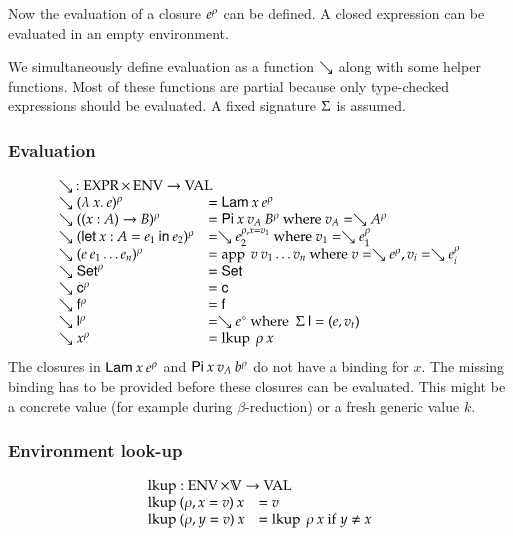 Now the evaluation of a closure $e^{\rho}$ can be defined. 
A closed expression can be evaluated in an empty environment.

We simultaneously define evaluation as a function $\searrow$ along with some helper functions.    
Most of these functions are partial because only type-checked expressions should be evaluated.
A fixed signature $\Sigma$ is assumed.

\subsubsection{Evaluation}

\[
\begin{array}{ll}
\multicolumn{2}{l}{\wh \: : \Expr \times \Env \ra \Val}\\
\wh \clp{\lam{x}{e}}{\rho} & = \vlam \: x \: \cl{e}{\rho} \\
\wh \clp{\EPi{x}{A}{B}}{\rho} &= \vpi \: x \: v_A \: \cl{B}{\rho} \mbox{ where } v_A = \wh \cl{A}{\rho} \\
\wh \clp{\ELet{x}{A}{e_1}{e_2}}{\rho} &= \wh \cl{e_2}{\ins{\rho}{x}{v_1}} \mbox { where } v_1 = \wh \cl{e_1}{\rho} \\
\wh \clp{e \: e_1 \ldots e_n}{\rho} &= \ap \: v \: v_1 \ldots v_n \mbox{ where } v = \wh \cl{e}{\rho} , v_i = \wh \cl{e_i}{\rho}\\
\wh \cl{\Set}{\rho} & = \Set \\ 
\wh \cl{\cc}{\rho} & = \cc  \\
\wh \cl{\ff}{\rho} & = \ff \\
\wh \cl{\dd}{\rho} & = \wh \cl{e}{\diamond} \mbox{ where } \: \Sig \: \dd = (e,v_t)\\
\wh \cl{x}{\rho} & = \lkup \: \rho \: x \\
\end{array}
\]
The closures in $\mathsf{Lam} \: x \: e^{\rho}$
and $\mathsf{Pi} \: x \: v_A \: b^{\rho}$ do not have a binding for $x$.
The missing binding has to be provided before these closures can be evaluated.
This might be a concrete value (for example during $\beta$-reduction) or a
fresh generic value $k$.

\subsubsection{Environment look-up}
\[
\begin{array}{ll}
\multicolumn{2}{l}{\lkup : \Env \times \cV \ra \Val }\\
\lkup \: (\ins{\rho}{x}{v}) \: x & = v \\
\lkup \: (\ins{\rho}{y}{v}) \: x & = \lkup \: \rho \: x \mbox{ if } y \neq x  
\end{array}
\]

